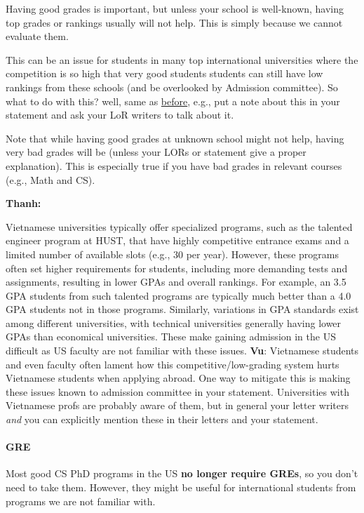 \documentclass[11pt]{article}
\newenvironment{commentbox}[1][]{
\small
    \begin{cbox}
    \textbf{#1} 
 }{
   \end{cbox}
}
\newcommand{\red}[1]{{\color{red}{#1}}}
\begin{document}
Having good grades is important, but unless your school is well-known, having top grades or rankings
usually will not help. This is simply because we cannot evaluate them.

This can be an issue for students in many top international universities where the competition is so high that very good students students can still have low rankings from these schools (and be overlooked by Admission committee).
So what to do with this? well, same as \hyperref[sec:your-school]{before}, e.g., put a note about this in your statement and ask your LoR writers to talk about it.

Note that while having good grades at unknown school might not help,
having very bad grades will be \red{red flag} (unless your LORs or
statement give a proper explanation). This is especially true if you
have bad grades in relevant courses (e.g., Math and CS).

\begin{commentbox}[Thanh:]
Vietnamese universities typically offer specialized programs, such as the talented engineer program at HUST, that have highly competitive entrance exams and a limited number of available slots (e.g., 30 per year). However, these programs often set higher requirements for students, including more demanding tests and assignments, resulting in lower GPAs and overall rankings. For example, an 3.5 GPA students from such talented programs are typically much better than a 4.0 GPA students not in those programs.  Similarly, variations in GPA standards exist among different universities, with technical universities generally having lower GPAs than economical universities. These make gaining admission in the US difficult as US faculty are not familiar with these issues.
\tcblower
\textbf{Vu}: Vietnamese students and even faculty often lament how this competitive/low-grading system hurts Vietnamese students when applying abroad. One way to mitigate this is making these issues known to admission committee in your statement.  Universities with Vietnamese profs are probably aware of them, but in general your letter writers \emph{and} you can explicitly mention these in their letters and your statement.
\end{commentbox}

\paragraph{GRE} Most good CS PhD programs in the US \textbf{no longer require GREs}, so you don't need to take them. However, they might be useful for international students from programs we are not familiar with. 
\end{document}
